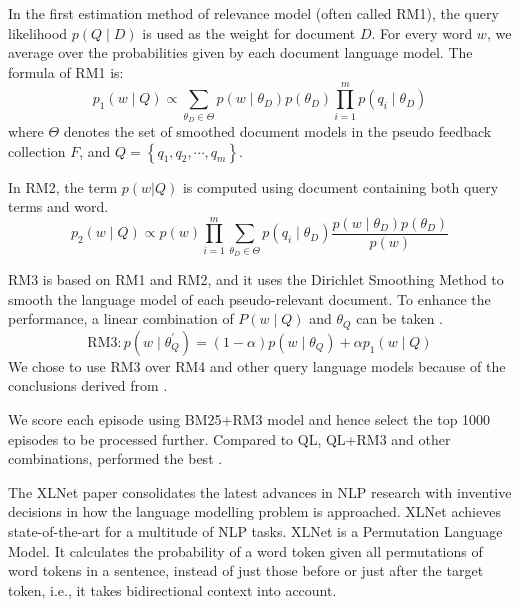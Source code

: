 \documentclass[10pt,twocolumn]{article}
\begin{document}
In the first estimation method of relevance model (often called RM1), the query likelihood $p(Q \mid D)$ is used as the weight for document $D$. For every word $w$, we average over the probabilities given by each document language model. The formula of RM1 is:
\begin{equation}
p_{1}(w \mid Q) \propto \sum_{\theta_{D} \in \Theta} p\left(w \mid \theta_{D}\right) p\left(\theta_{D}\right) \prod_{i=1}^{m} p\left(q_{i} \mid \theta_{D}\right)
\end{equation}
where $\Theta$ denotes the set of smoothed document models in the pseudo feedback collection $F$, and $Q=\left\{q_{1}, q_{2}, \cdots, q_{m}\right\}$.

In RM2, the term $p(w | Q)$ is computed using document containing both query terms and word.
\begin{equation}
p_{2}(w \mid Q) \propto p(w) \prod_{i=1}^{m} \sum_{\theta_{D} \in \Theta} p\left(q_{i} \mid \theta_{D}\right) \frac{p\left(w \mid \theta_{D}\right) p\left(\theta_{D}\right)}{p(w)}
\end{equation}

RM3 is based on RM1 and RM2, and it uses the Dirichlet Smoothing Method to smooth the language model of each pseudo-relevant document. To enhance the performance, a linear combination of $P(w \mid Q)$ and $\theta_{Q}$ can be taken \cite{PseudoRelevance}.
\begin{equation}
\mathrm{RM} 3: p\left(w \mid \theta_{Q}^{\prime}\right)=(1-\alpha) p\left(w \mid \theta_{Q}\right)+\alpha p_{1}(w \mid Q)
\end{equation}
We chose to use RM3 \cite{rm3} over RM4 and other query language models because of the conclusions derived from \cite{PseudoRelevance}.

We score each episode using BM25+RM3 model and hence select the top 1000 episodes to be processed further. Compared to QL, QL+RM3 and other combinations, performed the best \cite{bm25_rm3_comparison}.



The XLNet paper consolidates the latest advances in NLP research with inventive decisions in how the language modelling problem is approached. XLNet achieves state-of-the-art for a multitude of NLP tasks. XLNet is a Permutation Language Model. It calculates the probability of a word token given all permutations of word tokens in a sentence, instead of just those before or just after the target token, i.e., it takes bidirectional context into account.
\end{document}
